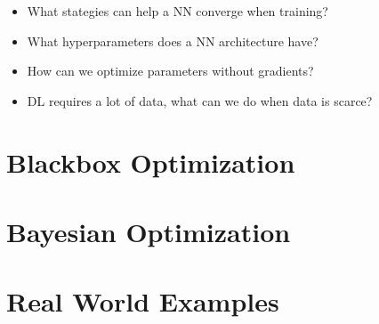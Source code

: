 \begin{summary}
    \begin{itemize}
        \item What stategies can help a NN converge when training?
        \item What hyperparameters does a NN architecture have?
        \item How can we optimize parameters without gradients? 
        \item DL requires a lot of data, what can we do when data is scarce?
    \end{itemize}
\end{summary}

\section{Blackbox Optimization}

\section{Bayesian Optimization}

\section{Real World Examples}